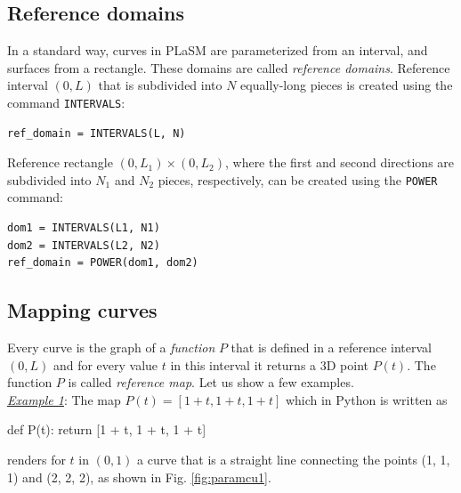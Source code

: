 \subsection{Reference domains}

In a standard way, curves in PLaSM are parameterized from an interval,
and surfaces from a rectangle. These domains are called
{\em reference domains}. 
Reference interval $(0, L)$ that is subdivided into $N$ equally-long pieces is 
created using the command {\tt INTERVALS}:\\

\begin{bbox}
\begin{verbatim}
ref_domain = INTERVALS(L, N)
\end{verbatim}
\end{bbox}
\vspace{6mm}

\noindent
Reference rectangle $(0, L_1) \times (0, L_2)$, where the first and second 
directions are subdivided into $N_1$ and $N_2$ pieces, respectively, can be 
created using the {\tt POWER} command:\\

\begin{bbox}
\begin{verbatim}
dom1 = INTERVALS(L1, N1)
dom2 = INTERVALS(L2, N2)
ref_domain = POWER(dom1, dom2)
\end{verbatim}
\end{bbox}
\vspace{6mm}

\noindent

\subsection{Mapping curves}

Every curve is the graph of a {\em function} $P$ that is defined 
in a reference interval $(0, L)$ and for every value $t$ in this 
interval it returns a 3D point $P(t)$. The function 
$P$ is called {\em reference map}. Let us show a few examples.\\

\noindent
\underline{\em Example 1}: The map
$
P(t) = [1+t, 1+t, 1+t]
$
which in Python is written as

\begin{bbox}
def P(t): return [1 + t, 1 + t, 1 + t]
\end{bbox}
renders for $t$ in $(0, 1)$ a curve that is a straight line connecting the 
points (1, 1, 1) and (2, 2, 2), as shown in Fig. \ref{fig:paramcu1}.

